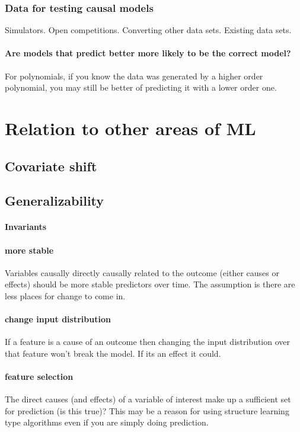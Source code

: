 \documentclass[11pt,a4paper,oneside]{book}
\begin{document}
\subsubsection*{Data for testing causal models}
Simulators. Open competitions. Converting other data sets. Existing data sets.

\paragraph*{Are models that predict better more likely to be the correct model?}
For polynomials, if you know the data was generated by a higher order polynomial, you may still be better of predicting it with a lower order one.

\section*{Relation to other areas of ML}
\subsection*{Covariate shift}
\subsection*{Generalizability}
\paragraph*{Invariants}
\paragraph{more stable} Variables causally directly causally related to the outcome (either causes or effects) should be more stable predictors over time. The assumption is there are less places for change to come in. 

\paragraph{change input distribution}If a feature is a cause of an outcome then changing the input distribution over that feature won't break the model. If its an effect it could.

\paragraph{feature selection} The direct causes (and effects) of a variable of interest make up a sufficient set for prediction (is this true)? This may be a reason for using structure learning type algorithms even if you are simply doing prediction.
\end{document}
